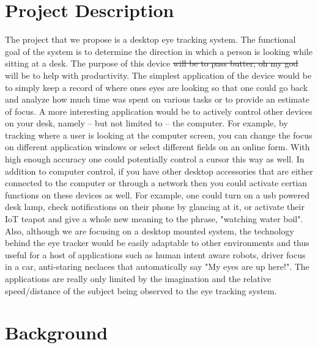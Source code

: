 \documentclass[12pt,conference,onecolumn]{IEEEtran}
\begin{document}
\section{Project Description} \label{sec:proj_desc}
The project that we propose is a desktop eye tracking system. The functional goal of the system is to determine the direction in which a person is looking while sitting at a desk. The purpose of this device \sout{will be to pass butter; oh my god} will be to help with productivity. The simplest application of the device would be to simply keep a record of where ones eyes are looking so that one could go back and analyze how much time was spent on various tasks or to provide an estimate of focus. A more interesting application would be to actively control other devices on your desk, namely -- but not limited to -- the computer. For example, by tracking where a user is looking at the computer screen, you can change the focus on different application windows or select different fields on an online form. With high enough accuracy one could potentially control a cursor this way as well. In addition to computer control, if you have other desktop accessories that are either connected to the computer or through a network then you could activate certian functions on these devices as well. For example, one could turn on a usb powered desk lamp, check notifications on their phone by glancing at it, or activate their IoT teapot and give a whole new meaning to the phrase, "watching water boil". Also, although we are focusing on a desktop mounted system, the technology behind the eye tracker would be easily adaptable to other environments and thus useful for a host of applications such as human intent aware robots, driver focus in a car, anti-staring neclaces that automatically say "My eyes are up here!". The applications are really only limited by the imagination and the relative speed/distance of the subject being observed to the eye tracking system.

\section{Background} \label{sec:background}
\end{document}
